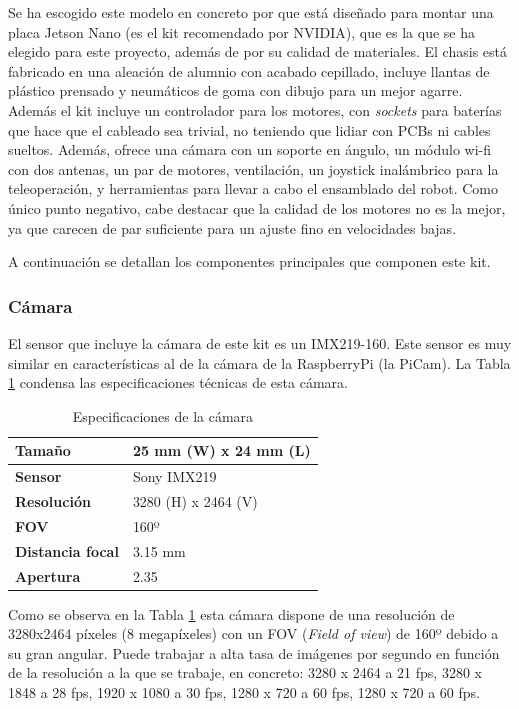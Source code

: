Se ha escogido este modelo en concreto por que está diseñado para montar una placa Jetson Nano (es el kit recomendado por NVIDIA), que es la que se ha elegido para este proyecto, además de por su calidad de materiales. El chasis está fabricado en una aleación de alumnio con acabado cepillado, incluye llantas de plástico prensado y neumáticos de goma con dibujo para un mejor agarre. Además el kit incluye un controlador para los motores, con \textit{sockets} para baterías que hace que el cableado sea trivial, no teniendo que lidiar con PCBs ni cables sueltos. Además, ofrece una cámara con un soporte en ángulo, un módulo wi-fi con dos antenas, un par de motores, ventilación, un joystick inalámbrico para la teleoperación, y herramientas para llevar a cabo el ensamblado del robot. Como único punto negativo, cabe destacar que la calidad de los motores no es la mejor, ya que carecen de par suficiente para un ajuste fino en velocidades bajas.

A continuación se detallan los componentes principales que componen este kit.

\subsubsection{Cámara}

El sensor que incluye la cámara de este kit es un IMX219-160. Este sensor es muy similar en características al de la cámara de la RaspberryPi (la PiCam). La Tabla \ref{tab:camera} condensa las especificaciones técnicas de esta cámara.

\begin{table}[H]
\centering
\captionsetup[table]{name=New Table Name}

\begin{tabular}{l|l} \hline
\textbf{Tamaño} & 25 mm (W) x 24 mm (L) \\ \hline
\textbf{Sensor} & Sony IMX219 \\ \hline
\textbf{Resolución} & 3280 (H) x 2464 (V) \\ \hline
\textbf{FOV} & 160º \\ \hline
\textbf{Distancia focal} & 3.15 mm\\ \hline
\textbf{Apertura} & 2.35\\ \hline
\end{tabular}
\caption{Especificaciones de la cámara}
\label{tab:camera}
\end{table}

Como se observa en la Tabla \ref{tab:camera} esta cámara dispone de una resolución de 3280x2464 píxeles (8 megapíxeles) con un FOV (\textit{Field of view}) de 160º debido a su gran angular. Puede trabajar a alta tasa de imágenes por segundo en función de la resolución a la que se trabaje, en concreto: 3280 x 2464 a 21 fps, 3280 x 1848 a 28 fps, 1920 x 1080 a 30 fps, 1280 x 720 a 60 fps, 1280 x 720 a 60 fps.


